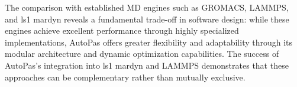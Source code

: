 \documentclass[conference]{IEEEtran}
\begin{document}
The comparison with established MD engines such as GROMACS, LAMMPS, and ls1 mardyn reveals a fundamental trade-off in software design: while these engines achieve excellent performance through highly specialized implementations, AutoPas offers greater flexibility and adaptability through its modular architecture and dynamic optimization capabilities. The success of AutoPas's integration into ls1 mardyn and LAMMPS demonstrates that these approaches can be complementary rather than mutually exclusive.

\newpage



\end{document}
